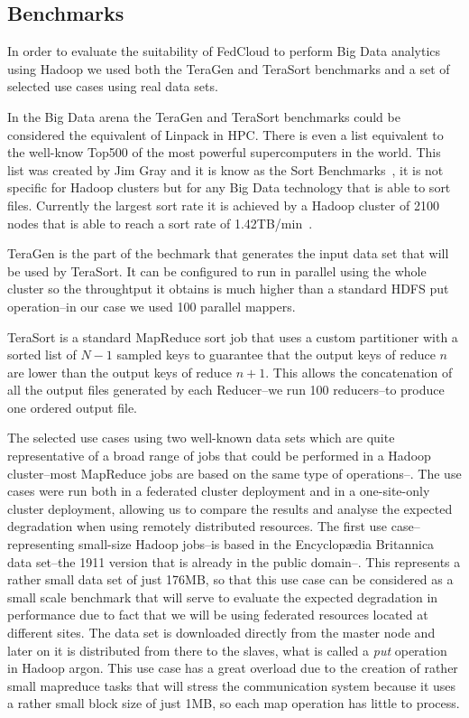 

\subsection{Benchmarks}
\label{ssect-execution}

In order to evaluate the suitability of FedCloud to perform Big Data analytics using Hadoop we used both the TeraGen and TeraSort benchmarks and a set of selected use cases using real data sets.

In the Big Data arena the TeraGen and TeraSort benchmarks could be considered the equivalent of Linpack in HPC. There is even a list equivalent to the well-know Top500 of the most powerful supercomputers in the world. This list was created by Jim Gray and it is know as the Sort Benchmarks~\cite{sortbenchmark}, it is not specific for Hadoop clusters but for any Big Data technology that is able to sort files. Currently the largest sort rate it is achieved by a Hadoop cluster of 2100 nodes that is able to reach a sort rate of 1.42TB/min~\cite{sortbenchmarkyahoo}.

TeraGen is the part of the bechmark that generates the input data set that will be used by TeraSort. It can be configured to run in parallel using the whole cluster so the throughtput it obtains is much higher than a standard HDFS put operation--in our case we used 100 parallel mappers.

TeraSort is a standard MapReduce sort job that uses a custom partitioner with a sorted list of $N-1$ sampled keys to guarantee that the output keys of reduce $n$ are lower than the output keys of reduce $n+1$. This allows the concatenation of all the output files generated by each Reducer--we run 100 reducers--to produce one ordered output file. 

The selected use cases using two well-known data sets which are quite representative of a broad range of jobs that could be performed in a Hadoop cluster--most MapReduce jobs are based on the same type of operations--. The use cases were run both in a federated cluster deployment and in a one-site-only cluster deployment, allowing us to compare the results and analyse the expected degradation when using remotely distributed resources.
The first use case--representing small-size Hadoop jobs--is based in the Encyclop{\ae}dia Britannica\cite{britannica} data set--the 1911 version that is already in the public domain--. This represents a rather small data set of just 176MB, so that this use case can be considered as a small scale benchmark that will serve to evaluate the expected degradation in performance due to fact that we will be using federated resources located at different sites. The data set is downloaded directly from the master node and later on it is distributed from there to the slaves, what is called a \emph{put} operation in Hadoop argon. This use case has a great overload due to the creation of rather small mapreduce tasks that will stress the communication system because it uses a rather small block size of just 1MB, so each map operation has little to process.

